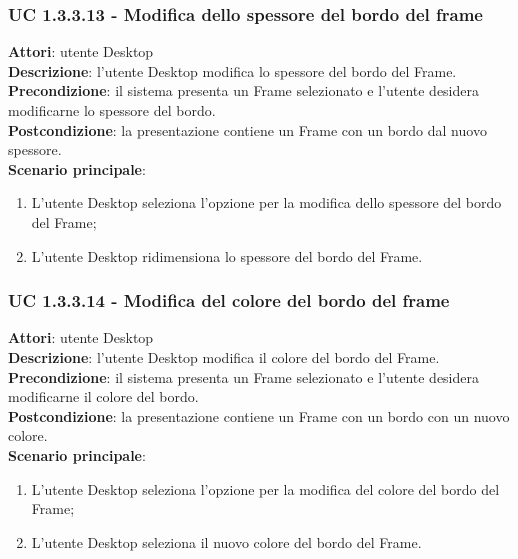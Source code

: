 \subsubsection{UC 1.3.3.13 - Modifica dello spessore del bordo del frame}{
	\label{uc1.3.3.13}
	\textbf{Attori}: utente Desktop \\
	\textbf{Descrizione}: l'utente Desktop modifica lo spessore del bordo del Frame. \\
	\textbf{Precondizione}: il sistema presenta un Frame selezionato e l'utente desidera modificarne lo spessore del bordo.	\\
	\textbf{Postcondizione}: la presentazione contiene un Frame con un bordo dal nuovo spessore.	\\
	\textbf{Scenario principale}:
	\begin{enumerate}
		\item L'utente Desktop seleziona l'opzione per la modifica dello spessore del bordo del Frame;
		\item L'utente Desktop ridimensiona lo spessore del bordo del Frame.
	\end{enumerate}
	}
\subsubsection{UC 1.3.3.14 - Modifica del colore del bordo del frame}{
	\label{uc1.3.3.14}
	\textbf{Attori}: utente Desktop \\
	\textbf{Descrizione}: l'utente Desktop modifica il colore del bordo del Frame. \\
	\textbf{Precondizione}: il sistema presenta un Frame selezionato e l'utente desidera modificarne il colore del bordo.	\\
	\textbf{Postcondizione}: la presentazione contiene un Frame con un bordo con un nuovo colore.	\\
	\textbf{Scenario principale}:
	\begin{enumerate}
		\item L'utente Desktop seleziona l'opzione per la modifica del colore del bordo del Frame;
		\item L'utente Desktop seleziona il nuovo colore del bordo del Frame.
	\end{enumerate}
	}
